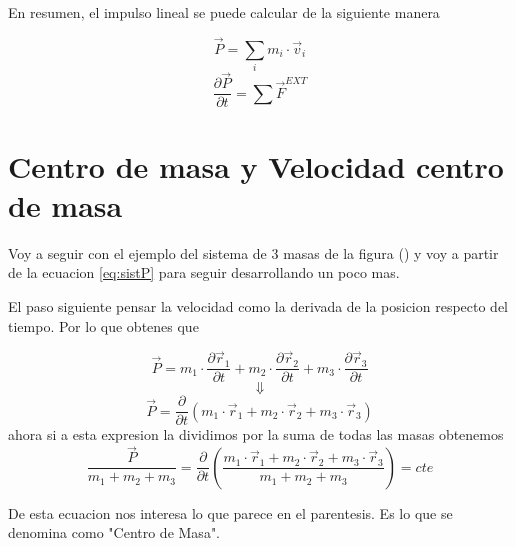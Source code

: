 \documentclass[../Main.tex]{subfiles}
\begin{document}
\begin{minipage}[t]{0.6\textwidth}
En resumen, el impulso lineal se puede calcular de la siguiente manera

\begin{equation*}
    \vec{P} = \sum _i m_i \cdot \vec{v} _i
\end{equation*}
\begin{equation*}
    \frac{\partial \vec{P}}{\partial t} = \sum \vec{F}^{EXT}
\end{equation*}

\end{minipage}
\newpage
\begin{minipage}[t]{0.3\textwidth}
\end{minipage}
\hfill
\begin{minipage}[t]{0.6\textwidth}

\section{Centro de masa y Velocidad centro de masa}

Voy a seguir con el ejemplo del sistema de 3 masas de la figura () y voy a
partir de la ecuacion \ref{eq:sistP} para seguir desarrollando un poco mas.

El paso siguiente pensar la velocidad como la derivada de la posicion respecto
del tiempo. Por lo que obtenes que 

\begin{equation*}
    \vec{P} = m_1 \cdot \frac{\partial \vec{r} _1}{\partial t} + m_2 \cdot \frac{\partial \vec{r} _2}{\partial t} + m_3 \cdot \frac{\partial \vec{r} _3}{\partial t}
\end{equation*}
\begin{equation*}
    \Downarrow
\end{equation*}
\begin{equation*}
    \vec{P} = \frac{\partial}{\partial t}(m_1 \cdot \vec{r} _1 + m_2 \cdot \vec{r} _2 + m_3 \cdot \vec{r} _3)
\end{equation*}
ahora si a esta expresion la dividimos por la suma de todas las masas obtenemos
\begin{equation}
    \frac{\vec{P}}{m_1 + m_2 + m_3} = \frac{\partial}{\partial t} \left(\frac{m_1 \cdot \vec{r} _1 + m_2 \cdot \vec{r} _2 + m_3 \cdot \vec{r} _3}{m_1 + m_2 + m_3} \right) = cte
    \label{eq:preRC}
\end{equation}

De esta ecuacion nos interesa lo que parece en el parentesis. Es lo que se
denomina como "Centro de Masa". 


\end{minipage}
\end{document}
